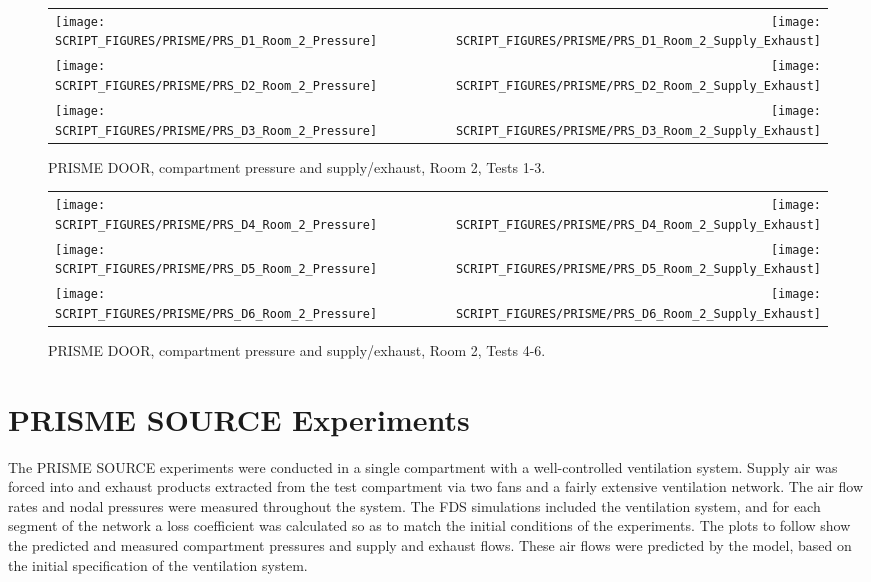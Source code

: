 \begin{figure}[p]
\begin{tabular*}{\textwidth}{l@{\extracolsep{\fill}}r}
\texttt{[image: SCRIPT\_FIGURES/PRISME/PRS\_D1\_Room\_2\_Pressure]} &
\texttt{[image: SCRIPT\_FIGURES/PRISME/PRS\_D1\_Room\_2\_Supply\_Exhaust]} \\
\texttt{[image: SCRIPT\_FIGURES/PRISME/PRS\_D2\_Room\_2\_Pressure]} &
\texttt{[image: SCRIPT\_FIGURES/PRISME/PRS\_D2\_Room\_2\_Supply\_Exhaust]} \\
\texttt{[image: SCRIPT\_FIGURES/PRISME/PRS\_D3\_Room\_2\_Pressure]} &
\texttt{[image: SCRIPT\_FIGURES/PRISME/PRS\_D3\_Room\_2\_Supply\_Exhaust]}
\end{tabular*}
\caption[PRISME DOOR, compartment pressure and supply/exhaust, Room 2, Tests 1-3]{PRISME DOOR, compartment pressure and supply/exhaust, Room 2, Tests 1-3.}
\label{PRISME_Room_2_Pressure_1-3}
\end{figure}

\begin{figure}[p]
\begin{tabular*}{\textwidth}{l@{\extracolsep{\fill}}r}
\texttt{[image: SCRIPT\_FIGURES/PRISME/PRS\_D4\_Room\_2\_Pressure]} &
\texttt{[image: SCRIPT\_FIGURES/PRISME/PRS\_D4\_Room\_2\_Supply\_Exhaust]} \\
\texttt{[image: SCRIPT\_FIGURES/PRISME/PRS\_D5\_Room\_2\_Pressure]} &
\texttt{[image: SCRIPT\_FIGURES/PRISME/PRS\_D5\_Room\_2\_Supply\_Exhaust]} \\
\texttt{[image: SCRIPT\_FIGURES/PRISME/PRS\_D6\_Room\_2\_Pressure]} &
\texttt{[image: SCRIPT\_FIGURES/PRISME/PRS\_D6\_Room\_2\_Supply\_Exhaust]}
\end{tabular*}
\caption[PRISME DOOR, compartment pressure and supply/exhaust, Room 2, Tests 4-6]{PRISME DOOR, compartment pressure and supply/exhaust, Room 2, Tests 4-6.}
\label{PRISME_Room_2_Pressure_4-6}
\end{figure}


\clearpage

\section{PRISME SOURCE Experiments}

The PRISME SOURCE experiments were conducted in a single compartment with a well-controlled ventilation system. Supply air was forced into and exhaust products extracted from the test compartment via two fans and a fairly extensive ventilation network. The air flow rates and nodal pressures were measured throughout the system. The FDS simulations included the ventilation system, and for each segment of the network a loss coefficient was calculated so as to match the initial conditions of the experiments. The plots to follow show the predicted and measured compartment pressures and supply and exhaust flows. These air flows were predicted by the model, based on the initial specification of the ventilation system.


